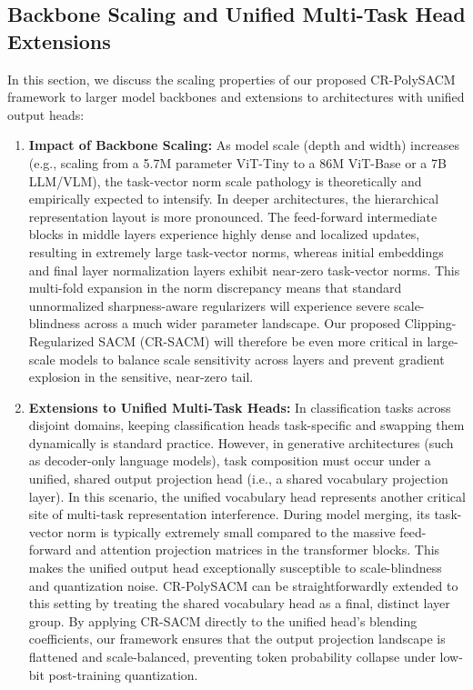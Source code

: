 \documentclass{article}
\theoremstyle{plain}
\theoremstyle{definition}
\theoremstyle{remark}
\begin{document}
\subsection{Backbone Scaling and Unified Multi-Task Head Extensions}
In this section, we discuss the scaling properties of our proposed CR-PolySACM framework to larger model backbones and extensions to architectures with unified output heads:
\begin{enumerate}
    \item \textbf{Impact of Backbone Scaling:} As model scale (depth and width) increases (e.g., scaling from a 5.7M parameter ViT-Tiny to a 86M ViT-Base or a 7B LLM/VLM), the task-vector norm scale pathology is theoretically and empirically expected to intensify. In deeper architectures, the hierarchical representation layout is more pronounced. The feed-forward intermediate blocks in middle layers experience highly dense and localized updates, resulting in extremely large task-vector norms, whereas initial embeddings and final layer normalization layers exhibit near-zero task-vector norms. This multi-fold expansion in the norm discrepancy means that standard unnormalized sharpness-aware regularizers will experience severe scale-blindness across a much wider parameter landscape. Our proposed Clipping-Regularized SACM (CR-SACM) will therefore be even more critical in large-scale models to balance scale sensitivity across layers and prevent gradient explosion in the sensitive, near-zero tail.
    \item \textbf{Extensions to Unified Multi-Task Heads:} In classification tasks across disjoint domains, keeping classification heads task-specific and swapping them dynamically is standard practice. However, in generative architectures (such as decoder-only language models), task composition must occur under a unified, shared output projection head (i.e., a shared vocabulary projection layer). In this scenario, the unified vocabulary head represents another critical site of multi-task representation interference. During model merging, its task-vector norm is typically extremely small compared to the massive feed-forward and attention projection matrices in the transformer blocks. This makes the unified output head exceptionally susceptible to scale-blindness and quantization noise. CR-PolySACM can be straightforwardly extended to this setting by treating the shared vocabulary head as a final, distinct layer group. By applying CR-SACM directly to the unified head's blending coefficients, our framework ensures that the output projection landscape is flattened and scale-balanced, preventing token probability collapse under low-bit post-training quantization.
\end{enumerate}
\end{document}
